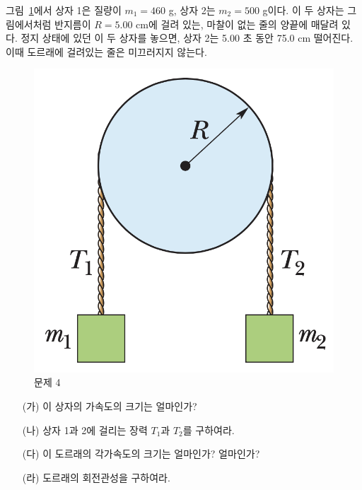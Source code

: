 \documentclass[floatfix,nofootinbib,superscriptaddress,fleqn]{revtex4-2}
\begin{document}
\vspace{1.cm}

그림~\ref{fig:4}에서 상자 1은 질량이 $m_1=460$ g, 상자 2는 $m_2=500$
g이다. 이 두 상자는 그림에서처럼 반지름이 $R=5.00$ cm에 걸려 있는, 
마찰이 없는 줄의 양끝에 매달려 있다.  정지 상태에 있던 이 두 상자를
놓으면, 상자 2는 5.00 초 동안 75.0 cm 떨어진다.  이때 도르래에
걸려있는 줄은 미끄러지지 않는다.  
\begin{figure}[htp]
  \centering
\includegraphics[scale=0.4]{Qfig13-4-20220425.png} 
  \caption{문제 4}
  \label{fig:4}
\end{figure}
\begin{itemize}
\item[(가)] 이 상자의 가속도의 크기는 얼마인가?
\item[(나)] 상자 1과 2에 걸리는 장력 $T_1$과 $T_2$를 구하여라.
\item[(다)] 이 도르래의 각가속도의 크기는 얼마인가?
  얼마인가?
\item[(라)] 도르래의 회전관성을 구하여라.
\end{itemize}
\end{document}
